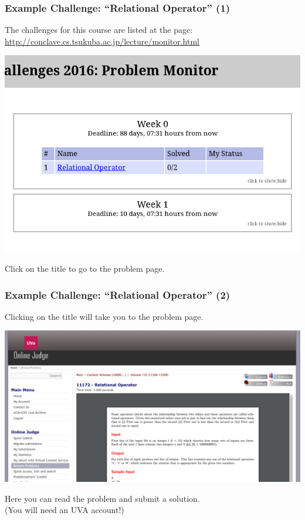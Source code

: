 \documentclass{beamer}
\begin{document}
\begin{frame}
  \frametitle{Example Challenge: ``Relational Operator'' (1)}

  {\small
  The challenges for this course are listed at the page:\\
  {\smaller \url{http://conclave.cs.tsukuba.ac.jp/lecture/monitor.html}}

  \begin{center}
    \includegraphics[width=.7\textwidth]{../img/monitorpage}
  \end{center}

  Click on the title to go to the problem page.}
\end{frame}

\begin{frame}
  \frametitle{Example Challenge: ``Relational Operator'' (2)}

  Clicking on the title will take you to the problem page.
  
  \begin{center}
    \includegraphics[width=.9\textwidth]{../img/relationaloperator}
  \end{center}

  Here you can read the problem and submit a solution.\\
  (You will need an UVA account!)

\end{frame}
\end{document}
